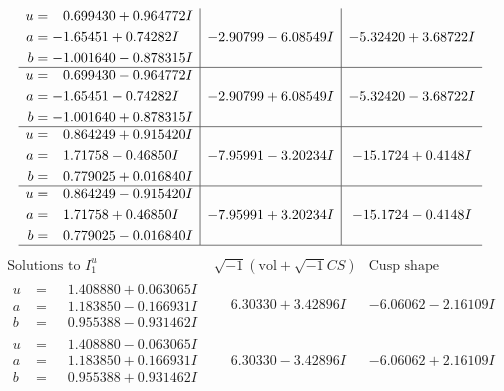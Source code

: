 \documentclass[1p]{elsarticle_modified}
\theoremstyle{definition}
\newcommand{\I}{\sqrt{-1}}
\begin{document}
$$\begin{array}{c|c|c}
\begin{aligned}
u &= \phantom{-}0.699430 + 0.964772 I \\
a &= -1.65451 + 0.74282 I \\
b &= -1.001640 - 0.878315 I\end{aligned}
 & -2.90799 - 6.08549 I & -5.32420 + 3.68722 I \\ \hline\begin{aligned}
u &= \phantom{-}0.699430 - 0.964772 I \\
a &= -1.65451 - 0.74282 I \\
b &= -1.001640 + 0.878315 I\end{aligned}
 & -2.90799 + 6.08549 I & -5.32420 - 3.68722 I \\ \hline\begin{aligned}
u &= \phantom{-}0.864249 + 0.915420 I \\
a &= \phantom{-}1.71758 - 0.46850 I \\
b &= \phantom{-}0.779025 + 0.016840 I\end{aligned}
 & -7.95991 - 3.20234 I & -15.1724 + 0.4148 I \\ \hline\begin{aligned}
u &= \phantom{-}0.864249 - 0.915420 I \\
a &= \phantom{-}1.71758 + 0.46850 I \\
b &= \phantom{-}0.779025 - 0.016840 I\end{aligned}
 & -7.95991 + 3.20234 I & -15.1724 - 0.4148 I\\
 \hline 
 \end{array}$$\newpage$$\begin{array}{c|c|c}  
\text{Solutions to }I^u_{1}& \I (\text{vol} + \sqrt{-1}CS) & \text{Cusp shape}\\
 \hline 
\begin{aligned}
u &= \phantom{-}1.408880 + 0.063065 I \\
a &= \phantom{-}1.183850 - 0.166931 I \\
b &= \phantom{-}0.955388 - 0.931462 I\end{aligned}
 & \phantom{-}6.30330 + 3.42896 I & -6.06062 - 2.16109 I \\ \hline\begin{aligned}
u &= \phantom{-}1.408880 - 0.063065 I \\
a &= \phantom{-}1.183850 + 0.166931 I \\
b &= \phantom{-}0.955388 + 0.931462 I\end{aligned}
 & \phantom{-}6.30330 - 3.42896 I & -6.06062 + 2.16109 I \\ \hline\begin{aligned}

\end{aligned}
\end{array}$$
\end{document}
